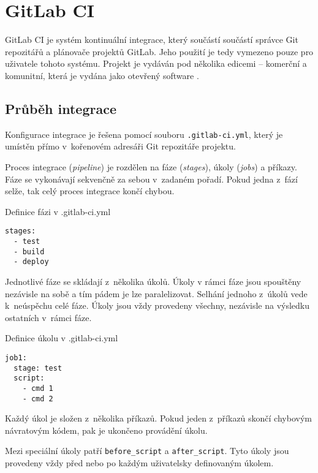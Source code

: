 \chapter{GitLab CI}

GitLab CI je systém kontinuální integrace, který součástí součástí správce Git repozitářů a plánovače projektů GitLab.
Jeho použití je tedy vymezeno pouze pro uživatele tohoto systému.
Projekt je vydáván pod několika edicemi -- komerční a komunitní, která je vydána jako otevřený software \cite{gitlab_ce}.

\section{Průběh integrace}

Konfigurace integrace je řešena pomocí souboru \verb|.gitlab-ci.yml|, který je umístěn přímo v~kořenovém adresáři Git repozitáře projektu.

Proces integrace (\textit{pipeline}) je rozdělen na fáze (\textit{stages}), úkoly (\textit{jobs}) a příkazy.
Fáze se vykonávají sekvenčně za sebou v~zadaném pořadí.
Pokud jedna z~fází selže, tak celý proces integrace končí chybou.

\begin{listing}[ht]
\caption{Definice fázi v .gitlab-ci.yml}
\begin{verbatim}
stages:
  - test
  - build
  - deploy
\end{verbatim}
\end{listing}

Jednotlivé fáze se skládají z~několika úkolů.
Úkoly v rámci fáze jsou spouštěny nezávisle na sobě a tím pádem je lze paralelizovat.
Selhání jednoho z~úkolů vede k~neúspěchu celé fáze.
Úkoly jsou vždy provedeny všechny, nezávisle na výsledku ostatních v~rámci fáze.

\begin{listing}[ht]
\caption{Definice úkolu v .gitlab-ci.yml}
\begin{verbatim}
job1:
  stage: test
  script:
    - cmd 1
    - cmd 2
\end{verbatim}
\end{listing}

Každý úkol je složen z~několika příkazů.
Pokud jeden z~příkazů skončí chybovým návratovým kódem, pak je ukončeno provádění úkolu.

Mezi speciální úkoly patří \verb|before_script| a \verb|after_script|.
Tyto úkoly jsou provedeny vždy před nebo po každým uživatelsky definovaným úkolem.

